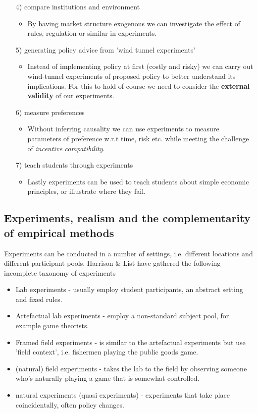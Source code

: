\documentclass[12pt, a4paper]{article}
\begin{document}
\begin{multicols}{2}
\begin{itemize}
\begin{itemize}
\end{itemize}
\item[4)] compare institutions and environment
\begin{itemize}
\item By having market structure exogenous we can investigate the effect of rules, regulation or similar in experiments.
\end{itemize}
\item[5)] generating policy advice from 'wind tunnel experiments'
\begin{itemize}
\item Instead of implementing policy at first (costly and risky) we can carry out wind-tunnel experiments of proposed policy to better understand its implications. For this to hold of course we need to consider the \textbf{external validity} of our experiments.
\end{itemize}
\item[6)] measure preferences
\begin{itemize}
\item Without inferring causality we can use experiments to measure parameters of preference w.r.t time, risk etc. while meeting the challenge of \textit{incentive compatibility}. 
\end{itemize}
\item[7)] teach students through experiments
\begin{itemize}
\item Lastly experiments can be used to teach students about simple economic principles, or illustrate where they fail.
\end{itemize}
\end{itemize}

\subsection{Experiments, realism and the complementarity of empirical methods}
Experiments can be conducted in a number of settings, i.e. different locations and different participant pools. Harrison \& List have gathered the following incomplete taxonomy of experiments
\begin{itemize}
\item Lab experiments - usually employ student participants, an abstract setting and fixed rules.
\item Artefactual lab experiments - employ a non-standard subject pool, for example game theorists.
\item Framed field experiments - is similar to the artefactual experiments but use 'field context', i.e. fishermen playing the public goods game.
\item (natural) field experiments - takes the lab to the field by observing someone who's naturally playing a game that is somewhat controlled.
\item natural experiments (quasi experiments) - experiments that take place coincidentally, often policy changes. 
\end{itemize}

\end{multicols}
\end{document}
